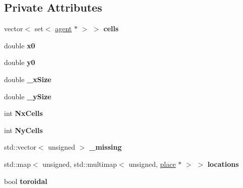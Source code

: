 \subsection*{Private Attributes}
\begin{DoxyCompactItemize}
\item 
\mbox{\label{classsearchGrid_abcbade9dd5c49d7f21f8ca4d2d389bb7}} 
vector$<$ set$<$ \mbox{\hyperlink{classagent}{agent}} $\ast$ $>$ $>$ {\bfseries cells}
\item 
\mbox{\label{classsearchGrid_ae0a1425af35ac4aa652ed1e28b73a140}} 
double {\bfseries x0}
\item 
\mbox{\label{classsearchGrid_a6bdbc7c04a45f23877e566b643ea4642}} 
double {\bfseries y0}
\item 
\mbox{\label{classsearchGrid_ae1d710e6d2dd455b9b69f3c48c43c0bf}} 
double {\bfseries \+\_\+x\+Size}
\item 
\mbox{\label{classsearchGrid_ac49fab1f8a1706d1e65619ca2d587474}} 
double {\bfseries \+\_\+y\+Size}
\item 
\mbox{\label{classsearchGrid_a66b87cd34dcd0a114c1295ac33304f08}} 
int {\bfseries Nx\+Cells}
\item 
\mbox{\label{classsearchGrid_ae3b6fdc38063bf0609e49342af476c63}} 
int {\bfseries Ny\+Cells}
\item 
\mbox{\label{classsearchGrid_a3fcbadbf55e0146f6d01a6f6cbb2074a}} 
std\+::vector$<$ unsigned $>$ {\bfseries \+\_\+missing}
\item 
\mbox{\label{classsearchGrid_aa09779b2ac41876c3eb170e000ce87dd}} 
std\+::map$<$ unsigned, std\+::multimap$<$ unsigned, \mbox{\hyperlink{classplace}{place}} $\ast$ $>$ $>$ {\bfseries locations}
\item 
\mbox{\label{classsearchGrid_a1498867f06c563b6be60ce0ff594a951}} 
bool {\bfseries toroidal}
\item 
\mbox{\label{classsearchGrid_a57127c0bf401e03e9787a926471581bd}} 

\end{DoxyCompactItemize}
